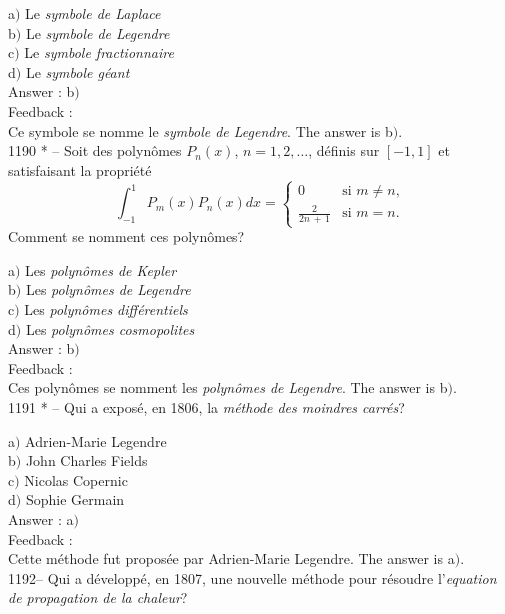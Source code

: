 ﻿\documentclass[letterpaper, 12pt]{article}
\begin{document}
a$)$ Le {\sl symbole de Laplace} \\
b$)$ Le {\sl symbole de Legendre} \\
c$)$ Le {\sl symbole fractionnaire} \\
d$)$ Le {\sl symbole g\'eant}\\

Answer : b$)$\\

Feedback : \\
Ce symbole se nomme le {\sl symbole de Legendre}.
The answer is b$)$.\\

1190 * -- Soit des polyn\^omes $P_n(x)$, $n=1,2,\ldots$, d\'efinis sur
$[-1,1]$ et satisfaisant la propri\'et\'e
$$\displaystyle{\int_{-1}^1P_m(x)P_n(x)dx=}\begin{cases}
0&\text{si $m\not=n$,}\\[3mm]
\frac2{2n\,+\,1}&\text{si $m=n$.}
\end{cases}$$
Comment se nomment ces polyn\^omes?

a$)$ Les {\sl polyn\^omes de Kepler} \\
b$)$ Les {\sl polyn\^omes de Legendre} \\
c$)$ Les {\sl polyn\^omes diff\'erentiels} \\
d$)$ Les {\sl polyn\^omes cosmopolites}\\

Answer : b$)$\\

Feedback : \\
Ces polyn\^omes se nomment les {\sl polyn\^omes de Legendre}.
The answer is b$)$.\\

1191 * -- Qui a expos\'e, en 1806, la {\sl m\'ethode des moindres
carr\'es}?

a$)$ Adrien-Marie Legendre \\
b$)$ John Charles Fields \\
c$)$ Nicolas Copernic \\
d$)$ Sophie Germain\\

Answer : a$)$\\

Feedback : \\
Cette m\'ethode fut propos\'ee par Adrien-Marie Legendre.
The answer is a$)$.\\

1192-- Qui a d\'evelopp\'e, en 1807, une nouvelle m\'ethode pour
r\'esoudre l'{\sl equation de propagation de la chaleur}?
\end{document}
